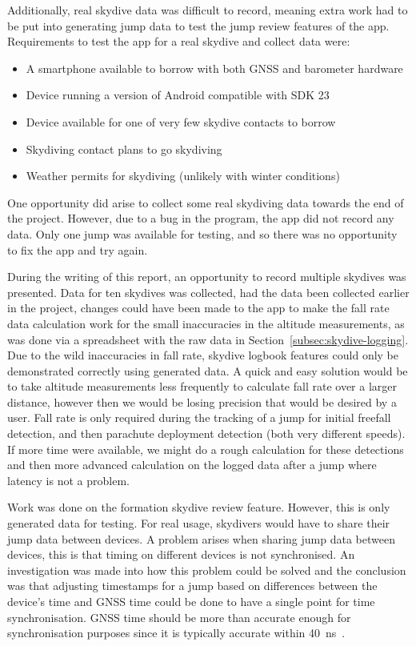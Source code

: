 Additionally, real skydive data was difficult to record, meaning extra work had to be put into generating jump data to test the jump review features of the app. Requirements to test the app for a real skydive and collect data were:
\begin{itemize}
  \item A smartphone available to borrow with both GNSS and barometer hardware
  \item Device running a version of Android compatible with SDK 23
  \item Device available for one of very few skydive contacts to borrow
  \item Skydiving contact plans to go skydiving
  \item Weather permits for skydiving (unlikely with winter conditions)
\end{itemize}
One opportunity did arise to collect some real skydiving data towards the end of the project. However, due to a bug in the program, the app did not record any data. Only one jump was available for testing, and so there was no opportunity to fix the app and try again.

During the writing of this report, an opportunity to record multiple skydives was presented. Data for ten skydives was collected, had the data been collected earlier in the project, changes could have been made to the app to make the fall rate data calculation work for the small inaccuracies in the altitude measurements, as was done via a spreadsheet with the raw data in Section~\ref{subsec:skydive-logging}. Due to the wild inaccuracies in fall rate, skydive logbook features could only be demonstrated correctly using generated data. A quick and easy solution would be to take altitude measurements less frequently to calculate fall rate over a larger distance, however then we would be losing precision that would be desired by a user.
Fall rate is only required during the tracking of a jump for initial freefall detection, and then parachute deployment detection (both very different speeds). If more time were available, we might do a rough calculation for these detections and then more advanced calculation on the logged data after a jump where latency is not a problem.

Work was done on the formation skydive review feature. However, this is only generated data for testing. For real usage, skydivers would have to share their jump data between devices. A problem arises when sharing jump data between devices, this is that timing on different devices is not synchronised. An investigation was made into how this problem could be solved and the conclusion was that adjusting timestamps for a jump based on differences between the device's time and GNSS time could be done to have a single point for time synchronisation. GNSS time should be more than accurate enough for synchronisation purposes since it is typically accurate within \SI{40}{\nano\second}~\cite{_gps_????}.

